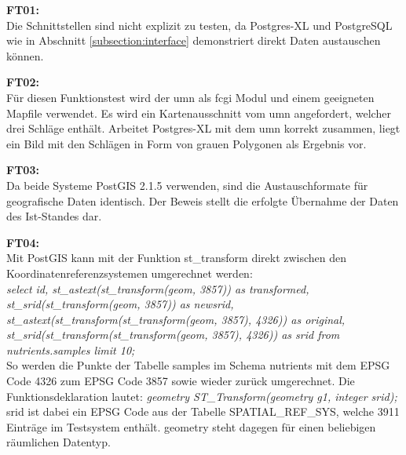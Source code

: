 
\textbf{FT01:}\\
Die Schnittstellen sind nicht explizit zu testen, da Postgres-XL und PostgreSQL wie in Abschnitt \ref{subsection:interface} demonstriert direkt Daten austauschen können.

\textbf{FT02:}\\
Für diesen Funktionstest wird der \Gls{umn} als \Gls{fcgi} Modul und einem geeigneten Mapfile verwendet.
Es wird ein Kartenausschnitt vom \Gls{umn} angefordert, welcher drei Schläge enthält.
Arbeitet Postgres-XL mit dem \Gls{umn} korrekt zusammen, liegt ein Bild mit den Schlägen in Form von  grauen Polygonen als Ergebnis vor.

\textbf{FT03:}\\
Da beide Systeme PostGIS 2.1.5 verwenden, sind die Austauschformate für geografische Daten identisch.
Der Beweis stellt die erfolgte Übernahme der Daten des Ist-Standes dar.

\textbf{FT04:}\\
Mit PostGIS kann mit der Funktion st\_{}transform direkt zwischen den Koordinatenreferenzsystemen umgerechnet werden:\\
\textit{select id, st\_{}astext(st\_{}transform(geom, 3857)) as transformed, st\_{}srid(st\_{}transform(geom, 3857)) as newsrid, st\_{}astext(st\_{}transform(st\_{}transform(geom, 3857), 4326)) as original, st\_{}srid(st\_{}transform(st\_{}transform(geom, 3857), 4326)) as srid from nutrients.samples limit 10;}\\
So werden die Punkte der Tabelle samples im Schema nutrients mit dem EPSG Code 4326 zum EPSG Code 3857 sowie wieder zurück umgerechnet.
Die Funktionsdeklaration lautet:
\textit{geometry ST\_{}Transform(geometry g1, integer srid);}\\
srid ist dabei ein EPSG Code aus der Tabelle SPATIAL\_{}REF\_{}SYS, welche 3911 Einträge im Testsystem enthält.
geometry steht dagegen für einen beliebigen räumlichen Datentyp.

